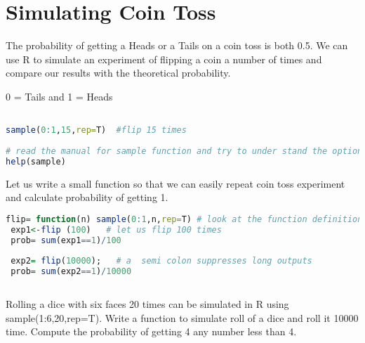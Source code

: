 \documentclass["../Applied_probabillity _and_statistics_lab_KTU.tex"]{subfiles}
\begin{document}
\section{Simulating Coin Toss}
 The probability of getting a Heads or a Tails on a coin toss is both 0.5.  We can use
R to simulate an experiment of flipping a coin a number of times and compare our results with
the theoretical probability.  

0 = Tails and 1 = Heads


\begin{lstlisting}[language=R]

sample(0:1,15,rep=T)  #flip 15 times
 
# read the manual for sample function and try to under stand the options.
help(sample) 
\end{lstlisting}

Let us write a small function so that we can easily repeat coin toss experiment and calculate probability of getting 1.
 \begin{lstlisting}[language=R]
 flip= function(n) sample(0:1,n,rep=T) # look at the function definition and the argument passing.
 exp1<-flip (100) 	# let us flip 100 times
 prob= sum(exp1==1)/100
 
 exp2= flip(10000);   # a  semi colon suppresses long outputs
 prob= sum(exp2==1)/10000
 
 \end{lstlisting}
 
 Rolling a dice with six faces 20 times can be simulated in R using 
 sample(1:6,20,rep=T).  Write a function to simulate roll of a dice and roll it 10000 time. Compute the probability of getting 4 any number less than 4.
 
 
\end{document}
